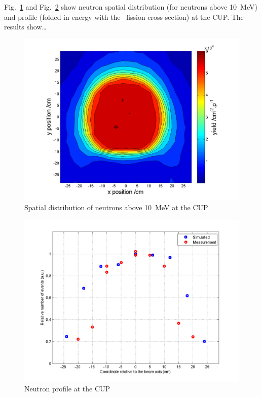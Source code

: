 \documentclass[11pt,a4paper]{IEEEtran}
\let\MYoriglatexcaption\caption
\renewcommand{\caption}[2][\relax]{\MYoriglatexcaption[#2]{#2}}
\def\U238{\BPChem{\^{238}U}}
\begin{document}
Fig.~\ref{fig:CUPDensity} and Fig.~\ref{fig:CUPProfile} show neutron spatial distribution (for neutrons above \SI{10}{\MeV}) and profile (folded in energy with the \U238\ fission cross-section) at the CUP.
The results show\ldots
{}

\begin{figure}[t]
    \centering
    \includegraphics[width=\columnwidth]{CUP10ColSpatialDistribution10MeV.png}
    \caption{Spatial distribution of neutrons above \SI{10}{\MeV} at the CUP}
    \label{fig:CUPDensity}
\end{figure}

\begin{figure}[t]
    \centering
    \includegraphics[width=\columnwidth]{CUPTOF10beamproRADECS.png}
    \caption{Neutron profile at the CUP}
    \label{fig:CUPProfile}
\end{figure}
\end{document}
